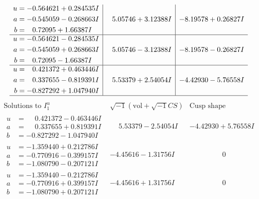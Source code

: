 \documentclass[1p]{elsarticle_modified}
\theoremstyle{definition}
\newcommand{\I}{\sqrt{-1}}
\begin{document}
$$\begin{array}{c|c|c}
\begin{aligned}
u &= -0.564621 + 0.284535 I \\
a &= -0.545059 - 0.268663 I \\
b &= \phantom{-}0.72095 + 1.66387 I\end{aligned}
 & \phantom{-}5.05746 + 3.12388 I & -8.19578 + 0.26827 I \\ \hline\begin{aligned}
u &= -0.564621 - 0.284535 I \\
a &= -0.545059 + 0.268663 I \\
b &= \phantom{-}0.72095 - 1.66387 I\end{aligned}
 & \phantom{-}5.05746 - 3.12388 I & -8.19578 - 0.26827 I \\ \hline\begin{aligned}
u &= \phantom{-}0.421372 + 0.463446 I \\
a &= \phantom{-}0.337655 - 0.819391 I \\
b &= -0.827292 + 1.047940 I\end{aligned}
 & \phantom{-}5.53379 + 2.54054 I & -4.42930 - 5.76558 I\\
 \hline 
 \end{array}$$\newpage$$\begin{array}{c|c|c}  
\text{Solutions to }I^u_{1}& \I (\text{vol} + \sqrt{-1}CS) & \text{Cusp shape}\\
 \hline 
\begin{aligned}
u &= \phantom{-}0.421372 - 0.463446 I \\
a &= \phantom{-}0.337655 + 0.819391 I \\
b &= -0.827292 - 1.047940 I\end{aligned}
 & \phantom{-}5.53379 - 2.54054 I & -4.42930 + 5.76558 I \\ \hline\begin{aligned}
u &= -1.359440 + 0.212786 I \\
a &= -0.770916 - 0.399157 I \\
b &= -1.080790 - 0.207121 I\end{aligned}
 & -4.45616 - 1.31756 I & \phantom{-0.000000 } 0 \\ \hline\begin{aligned}
u &= -1.359440 - 0.212786 I \\
a &= -0.770916 + 0.399157 I \\
b &= -1.080790 + 0.207121 I\end{aligned}
 & -4.45616 + 1.31756 I & \phantom{-0.000000 } 0 \\ \hline\begin{aligned}

\end{aligned}
\end{array}$$
\end{document}
